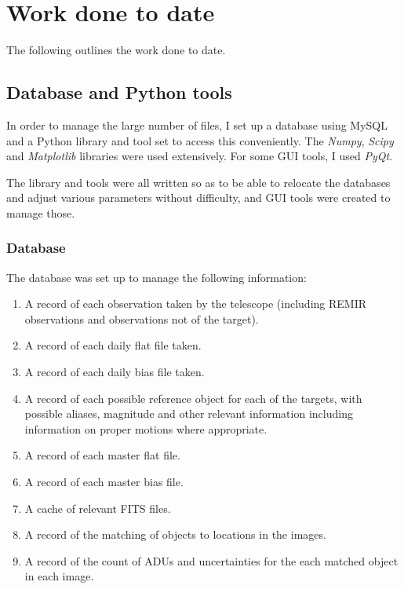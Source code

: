 \section{Work done to date}
\protect\label{section:workdonetodate}

The following outlines the work done to date.

\subsection{Database and Python tools}
\protect\label{section:databaseandtools}

In order to manage the large number of files, I set up a database using MySQL
and a Python library and tool set to access this conveniently. The
\textit{Numpy}, \textit{Scipy} and \textit{Matplotlib} libraries were used
extensively. For some GUI tools, I used \textit{PyQt}.

The library and tools were all written so as to be able to relocate the
databases and adjust various parameters without difficulty, and GUI tools were
created to manage those.

\subsubsection{Database}
\protect\label{seciion:database}

The database was set up to manage the following information:

\begin{enumerate}
  \item A record of each observation taken by the {\rem} telescope (including
  REMIR observations and observations not of the target).
  \item A record of each daily flat file taken.
  \item A record of each daily bias file taken.
  \item A record of each possible reference object for each of the {\rdwarf}
  targets, with possible aliases, magnitude and other relevant information
  including information on proper motions where appropriate.
  \item A record of each master flat file.
  \item A record of each master bias file.
  \item A cache of relevant FITS files.
  \item A record of the matching of objects to locations in the images.
  \item A record of the count of ADUs and uncertainties for the each matched
  object in each image.
\end{enumerate}

